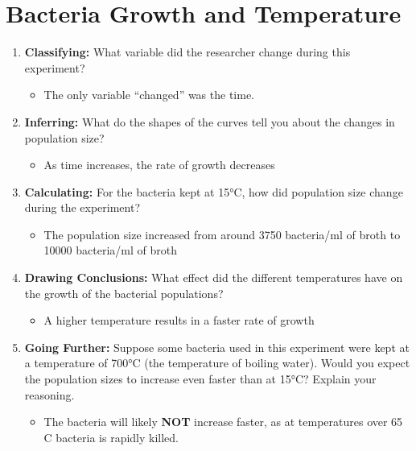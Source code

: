 \documentclass{scrartcl}
\begin{document}
\section{Bacteria Growth and Temperature}
\label{sec:orgd67b2f1}
\begin{enumerate}
\item \textbf{Classifying:} What variable did the researcher change during this experiment?
\begin{itemize}
\item The only variable ``changed'' was the time.
\end{itemize}
\item \textbf{Inferring:} What do the shapes of the curves tell you about the changes in
population size?
\begin{itemize}
\item As time increases, the rate of growth decreases
\end{itemize}
\item \textbf{Calculating:} For the bacteria kept at 15°C, how did population size change
during the experiment?
\begin{itemize}
\item The population size increased from around 3750 bacteria/ml of broth to
10000 bacteria/ml of broth
\end{itemize}
\item \textbf{Drawing Conclusions:} What effect did the different temperatures have on the
growth of the bacterial populations?
\begin{itemize}
\item A higher temperature results in a faster rate of growth
\end{itemize}
\item \textbf{Going Further:} Suppose some bacteria used in this experiment were kept at a
temperature of 700°C (the temperature of boiling water). Would you expect the
population sizes to increase even faster than at 15°C? Explain your
reasoning.
\begin{itemize}
\item The bacteria will likely \textbf{NOT} increase faster, as at temperatures over
65\textdegree{} C bacteria is rapidly killed.
\end{itemize}
\end{enumerate}
\end{document}
